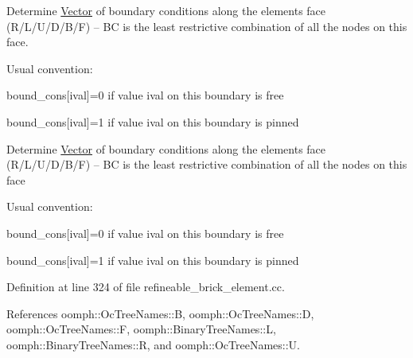 Determine \hyperlink{classoomph_1_1Vector}{Vector} of boundary conditions along the element\textquotesingle{}s face (R/\+L/\+U/\+D/\+B/F) -- BC is the least restrictive combination of all the nodes on this face. 

Usual convention\+:
\begin{DoxyItemize}
\item bound\+\_\+cons\mbox{[}ival\mbox{]}=0 if value ival on this boundary is free
\item bound\+\_\+cons\mbox{[}ival\mbox{]}=1 if value ival on this boundary is pinned
\end{DoxyItemize}

Determine \hyperlink{classoomph_1_1Vector}{Vector} of boundary conditions along the element\textquotesingle{}s face (R/\+L/\+U/\+D/\+B/F) -- BC is the least restrictive combination of all the nodes on this face

Usual convention\+:
\begin{DoxyItemize}
\item bound\+\_\+cons\mbox{[}ival\mbox{]}=0 if value ival on this boundary is free
\item bound\+\_\+cons\mbox{[}ival\mbox{]}=1 if value ival on this boundary is pinned 
\end{DoxyItemize}

Definition at line 324 of file refineable\+\_\+brick\+\_\+element.\+cc.



References oomph\+::\+Oc\+Tree\+Names\+::B, oomph\+::\+Oc\+Tree\+Names\+::D, oomph\+::\+Oc\+Tree\+Names\+::F, oomph\+::\+Binary\+Tree\+Names\+::L, oomph\+::\+Binary\+Tree\+Names\+::R, and oomph\+::\+Oc\+Tree\+Names\+::U.

\mbox{\label{classoomph_1_1RefineableQElement_3_013_01_4_aa0feadb4fbbe8861366a77373b122293}} 
